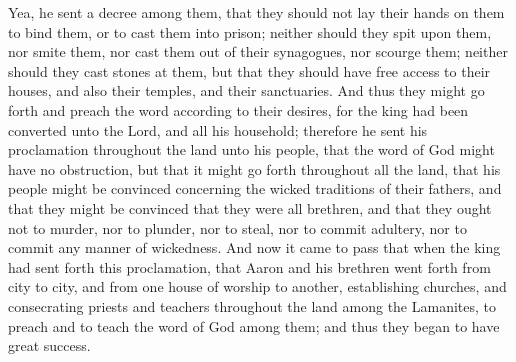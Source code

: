 Yea, he sent a decree among them, that they should not lay their hands on them to bind them, or to cast them into prison; neither should they spit upon them, nor smite them, nor cast them out of their synagogues, nor scourge them; neither should they cast stones at them, but that they should have free access to their houses, and also their temples, and their sanctuaries.
\bverse \iffalse And thus they might go forth and preach the word according to their desires, for the king had been converted unto the Lord, and all his household; therefore he sent his proclamation throughout the land unto his people, that the word of God might have no obstruction, but that it might go forth throughout all the land, that his people might be convinced concerning the wicked traditions of their fathers, and that they might be convinced that they were all brethren, and that they ought not to murder, nor to plunder, nor to steal, nor to commit adultery, nor to commit any manner of wickedness. \fi
And thus they might go forth and preach the word according to their desires, for the king had been converted unto the Lord, and all his household; therefore he sent his proclamation throughout the land unto his people, that the word of God might have no obstruction, but that it might go forth throughout all the land, that his people might be convinced concerning the wicked traditions of their fathers, and that they might be convinced that they were all brethren, and that they ought not to murder, nor to plunder, nor to steal, nor to commit adultery, nor to commit any manner of wickedness.
\bverse \iffalse And now it came to pass that when the king had sent forth this proclamation, that Aaron and his brethren went forth from city to city, and from one house of worship to another, establishing churches, and consecrating priests and teachers throughout the land among the Lamanites, to preach and to teach the word of God among them; and thus they began to have great success. \fi
And now it came to pass that when the king had sent forth this proclamation, that Aaron and his brethren went forth from city to city, and from one house of worship to another, establishing churches, and consecrating priests and teachers throughout the land among the Lamanites, to preach and to teach the word of God among them; and thus they began to have great success.
\bverse \iffalse And thousands were brought to the knowledge of the Lord, yea, thousands were brought to believe in the traditions of the Nephites; and they were taught the records and prophecies which were handed down even to the present time. \fi
